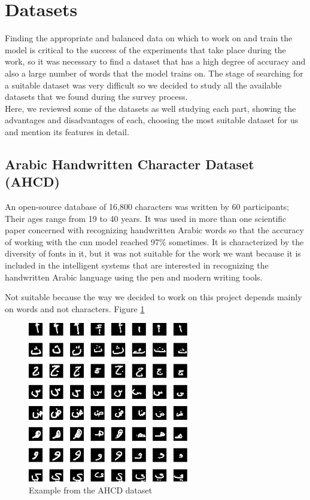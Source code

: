 \section{Datasets}
Finding the appropriate and balanced data on which to work on and train the model is critical to the success of the experiments that take place during the work, so it was necessary to find a dataset that has a high degree of accuracy and also a large number of words that the model trains on. The stage of searching for a suitable dataset was very difficult so we decided to study all the available datasets that we found during the survey process. \\

Here, we reviewed some of the datasets as well studying each part, showing the advantages and disadvantages of each, choosing the most suitable dataset for us and mention its features in detail.

\subsection{Arabic Handwritten Character Dataset (AHCD)}
An open-source database of 16,800 characters was written by 60 participants; Their ages range from 19 to 40 years. It was used in more than one scientific paper concerned with recognizing handwritten Arabic words so that the accuracy of working with the \acrshort{cnn} model reached 97\% sometimes.\cite{altwaijry2021arabic} It is characterized by the diversity of fonts in it, but it was not suitable for the work we want because it is included in the intelligent systems that are interested in recognizing the handwritten Arabic language using the pen and modern writing tools. 

Not suitable because the way we decided to work on this project depends mainly on words and not characters. Figure \ref{fig:AHCD sample}

\begin{figure}[!htb]
    \centering
    \includegraphics[width=7cm]{images/AHCD sample.png}
    \caption{Example from the AHCD dataset}
    \label{fig:AHCD sample}
\end{figure}

